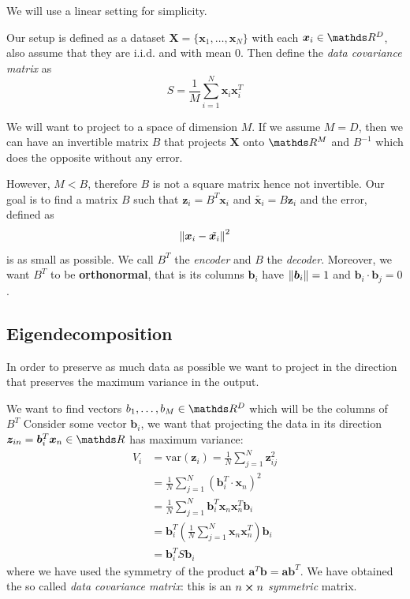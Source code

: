 \documentclass[12pt]{extarticle}
\renewcommand{\vec}[1]{\bm{#1}}
\begin{document}
We will use a linear setting for simplicity.

Our setup is defined as a dataset $\vec X = \{ \vec x_1, \dots, \vec x_N\}$
with each $\vec x_i \in \R^D$, also assume that they are i.i.d. and with mean $0$.
Then define the \emph{data covariance matrix} as
\begin{equation}
	S = \frac{1}{M} \sum_{i = 1}^N \vec x_i \vec x_i^T
\end{equation}

We will want to project to a space of dimension $M$. If we assume $M = D$, then we can have
an invertible matrix $B$ that projects $\bm X$ onto $\R^M$ and $B^{-1}$ which does the opposite
without any error.

However, $M < B$, therefore $B$ is not a square matrix hence not invertible.
Our goal is to find a matrix $B$ such that $\vec z_i = B^T \vec x_i$ and
$\tilde{\vec x_i} = B \vec z_i$ and the error, defined as
\begin{equation}
	\norm{\vec x_i - \tilde{\vec x_i}}^2
\end{equation}
is as small as possible.
We call $B^T$ the \emph{encoder} and $B$ the \emph{decoder}.
Moreover, we want $B^T$ to be \textbf{orthonormal},
that is its columns $\vec b_i$ have $\norm{\vec b_i} = 1$ and $\vec b_i \cdot \vec b_j = 0$.

\subsection{Eigendecomposition}

In order to preserve as much data as possible we want to project in the direction that preserves
the maximum variance in the output.

We want to find vectors $b_1, \dots, b_M \in \R^D$ which will be the columns of $B^T$
Consider some vector $\vec b_i$, we want that projecting the data in its direction
$\vec z_{in} = \vec b_i^T \vec x_n \in \R$ has maximum variance:
\begin{align}
	V_i & = \mathrm{var} (\vec z_i) = \frac{1}{N} \sum^N_{j = 1} \vec z_{ij}^2               \\
	    & = \frac{1}{N} \sum^N_{j = 1} (\vec b_i^T \cdot \vec x_n)^2                         \\
	    & = \frac{1}{N} \sum^N_{j = 1} \vec b_i^T \vec x_n \vec x_n^T \vec b_i               \\
	    & = \vec b_i^T \left(\frac{1}{N} \sum^N_{j = 1} \vec x_n \vec x_n^T \right) \vec b_i \\
	    & = \vec b_i^T S \vec b_i
\end{align}
where we have used the symmetry of the product $\vec a^T \vec b = \vec a \vec b^T$.
We have obtained the so called \emph{data covariance matrix}: this is an $n \cross n$
\emph{symmetric} matrix.
\end{document}
